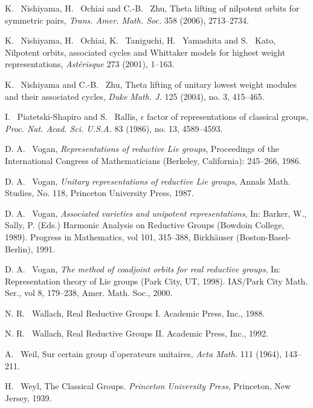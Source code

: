 \documentclass[lang = american]{ems-icm} %
\numberwithin{equation}{section}
\theoremstyle{remark}
\begin{document}
\begin{thebibliography}{99}
K. ~Nishiyama, H. ~Ochiai and C.-B. ~Zhu, Theta lifting of nilpotent orbits for symmetric pairs, \emph{Trans. Amer. Math. Soc.} 358 (2006), 2713--2734.


K. ~Nishiyama, H. ~Ochiai, K. ~Taniguchi, H. ~Yamashita and S. ~Kato,
Nilpotent orbits, associated cycles and Whittaker models for highest weight representations,
\emph{Ast\'erisque} 273 (2001), 1--163.


K. ~Nishiyama and C.-B. ~Zhu,
Theta lifting of unitary lowest weight modules and their associated cycles,
\emph{Duke Math. J.} 125 (2004), no. 3, 415--465.


I. ~Piatetski-Shapiro and S. ~Rallis, $\epsilon$ factor of representations of classical groups, \emph{Proc. Nat. Acad. Sci. U.S.A.} 83 (1986), no. 13, 4589--4593.


D. A. ~Vogan, \emph{Representations of reductive Lie groups}, Proceedings of the International Congress of Mathematicians (Berkeley, California): 245--266, 1986.


D. A. ~Vogan, \emph{Unitary representations of reductive Lie groups}, Annals Math. Studies, No. 118, Princeton University Press, 1987.

D. A. ~Vogan, \emph{Associated varieties and unipotent representations}, In: Barker, W., Sally, P. (Eds.) Harmonic Analysis on Reductive Groups (Bowdoin College, 1989). Progress in Mathematics, vol 101, 315--388, Birkh\"{a}user (Boston-Basel-Berlin), 1991.

D. A. ~Vogan, \emph{The method of coadjoint orbits for real reductive groups}, In: Representation theory of Lie groups (Park City, UT, 1998). IAS/Park City Math. Ser., vol 8, 179--238, Amer. Math. Soc., 2000.

N. R. ~Wallach, Real Reductive Groups I. Academic Press, Inc., 1988.

N. R. ~Wallach, Real Reductive Groups II. Academic Press, Inc., 1992.


A. ~Weil, Sur certain group d'operateurs unitaires, \emph{Acta Math.} 111 (1964), 143--211.

H. ~Weyl, The Classical Groups. \emph{Princeton University Press}, Princeton, New Jersey, 1939.




\end{thebibliography}
\end{document}
